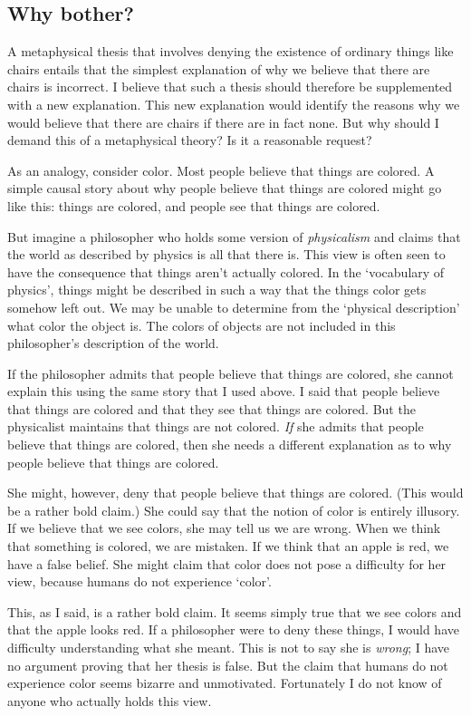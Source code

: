 \documentclass[11pt]{article}
\begin{document}
\begin{spacing}{1.5}
\subsection{Why bother?}
A metaphysical thesis that involves denying the existence of ordinary
things like chairs entails that the simplest explanation of why we
believe that there are chairs is incorrect.  I believe that such a
thesis should therefore be supplemented with a new explanation.  This
new explanation would identify the reasons why we would believe that
there are chairs if there are in fact none.  But why should I demand
this of a metaphysical theory?  Is it a reasonable request?

As an analogy, consider color.  Most people believe that things are
colored.  A simple causal story about why people believe that things
are colored might go like this:  things are colored, and people see
that things are colored.  

But imagine a philosopher who holds some version of {\em physicalism}
and claims that the world as described by physics is all that there
is.  This view is often seen to have the consequence that things
aren't actually colored.  In the `vocabulary of physics', things might
be described in such a way that the things color gets somehow left
out.  We may be unable to determine from the `physical description'
what color the object is.  The colors of objects are not included in
this philosopher's description of the world.

If the philosopher admits that people believe that things are colored,
she cannot explain this using the same story that I used above.  I
said that people believe that things are colored and that they see
that things are colored.  But the physicalist maintains that things
are not colored.  {\em If} she admits that people believe that things
are colored, then she needs a different explanation as to why people
believe that things are colored.

She might, however, deny that people believe that things are colored.
(This would be a rather bold claim.)  She could say that the notion of
color is entirely illusory.  If we believe that we see colors, she may
tell us we are wrong.  When we think that something is colored, we are
mistaken.  If we think that an apple is red, we have a false belief.
She might claim that color does not pose a difficulty for her view,
because humans do not experience `color'.

This, as I said, is a rather bold claim.  It seems simply true that we
see colors and that the apple looks red.  If a philosopher were to
deny these things, I would have difficulty understanding what she
meant.  This is not to say she is {\em wrong}; I have no argument
proving that her thesis is false.  But the claim that humans do not
experience color seems bizarre and unmotivated.  Fortunately I do not
know of anyone who actually holds this view.


\end{spacing}
\end{document}
